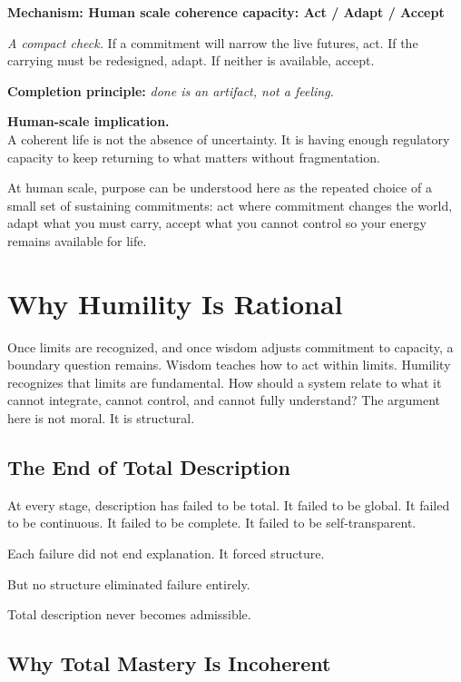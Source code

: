 \documentclass[11pt,twoside,openright]{book}
\newenvironment{mechanismbox}[1]
  {\begin{framed}\noindent\textbf{Mechanism: #1}\par\medskip}
  {\end{framed}}
\begin{document}
\begin{mechanismbox}{Human scale coherence capacity: Act / Adapt / Accept}
\medskip
\noindent\textit{A compact check.}
If a commitment will narrow the live futures, act.
If the carrying must be redesigned, adapt.
If neither is available, accept.

\medskip
\noindent\textbf{Completion principle:} \textit{done is an artifact, not a feeling.}

\medskip
\noindent\textbf{Human-scale implication.}\\
A coherent life is not the absence of uncertainty.
It is having enough regulatory capacity
to keep returning to what matters without fragmentation.

At human scale, purpose can be understood here as the repeated choice of a small set of sustaining commitments: act where commitment changes the world, adapt what you must carry, accept what you cannot control so your energy remains available for life.

\end{mechanismbox}

\chapter{Why Humility Is Rational}
\label{ch:humility_is_rational}

Once limits are recognized, and once wisdom adjusts commitment to capacity, a boundary question remains. Wisdom teaches how to act within limits. Humility recognizes that limits are fundamental. How should a system relate to what it cannot integrate, cannot control, and cannot fully understand? The argument here is not moral. It is structural.

\section*{The End of Total Description}

At every stage, description has failed to be total. It failed to be global. It failed to be continuous. It failed to be complete. It failed to be self-transparent.

Each failure did not end explanation. It forced structure.

But no structure eliminated failure entirely.

Total description never becomes admissible.

\section*{Why Total Mastery Is Incoherent}
\end{document}
